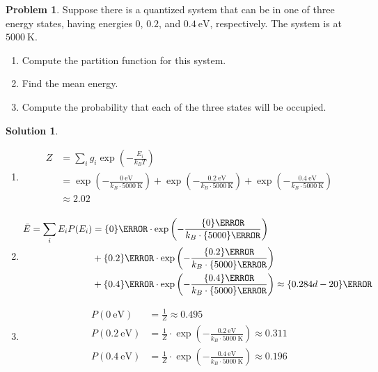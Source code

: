 \documentclass[10pt]{article}
\theoremstyle{definition}
\newtheorem{problem}{Problem}
\newtheorem{soln}{Solution}
\begin{document}
\begin{problem}
Suppose there is a quantized system that can be in one of three energy states, having energies $0$, $0.2$,
and $\qty{0.4}{\electronvolt}$, respectively. The system is at $\qty{5000}{\kelvin}$.
\begin{enumerate}[label=(\alph*)]
  \item Compute the partition function for this system.
  \item Find the mean energy.
  \item Compute the probability that each of the three states will be occupied.
\end{enumerate}
\end{problem}
\begin{soln}~
  \begin{enumerate}[label=(\alph*)]
    \item \begin{align*}
            Z & =\sum_{i}g_i\exp\left(-\frac{E_i}{k_BT}\right)                                 \\
              & =\exp\left(-\frac{\qty{0}{\electronvolt}}{k_B\cdot\qty{5000}{\kelvin}}\right)+
            \exp\left(-\frac{\qty{0.2}{\electronvolt}}{k_B\cdot\qty{5000}{\kelvin}}\right)+
            \exp\left(-\frac{\qty{0.4}{\electronvolt}}{k_B\cdot\qty{5000}{\kelvin}}\right)     \\
              & \approx 2.02                                                                   \\
          \end{align*}
    \item \begin{align*}
            \bar{E}  =\sum_{i}E_iP(E_i) & =
            \qty{0}{\electronvolt}\cdot\exp\left(-\frac{\qty{0}{\electronvolt}}{k_B\cdot\qty{5000}{\kelvin}}\right)                                                                         \\
                                        & +\qty{0.2}{\electronvolt}\cdot\exp\left(-\frac{\qty{0.2}{\electronvolt}}{k_B\cdot\qty{5000}{\kelvin}}\right)                                      \\
                                        & +\qty{0.4}{\electronvolt}\cdot\exp\left(-\frac{\qty{0.4}{\electronvolt}}{k_B\cdot\qty{5000}{\kelvin}}\right)\approx\qty{0.284d-20}{\electronvolt}
          \end{align*}
    \item \begin{align*}
            P(\qty{0}{\electronvolt})   & =\frac{1}{Z} \approx 0.495                                \\
            P(\qty{0.2}{\electronvolt}) & =
            \frac{1}{Z}\cdot\exp
            \left(-\frac{\qty{0.2}{\electronvolt}}{k_B\cdot\qty{5000}{\kelvin}}\right)\approx 0.311 \\
            P(\qty{0.4}{\electronvolt}) & =
            \frac{1}{Z}\cdot\exp
            \left(-\frac{\qty{0.4}{\electronvolt}}{k_B\cdot\qty{5000}{\kelvin}}\right)\approx 0.196
          \end{align*}
  \end{enumerate}
\end{soln}
\newpage
\end{document}
